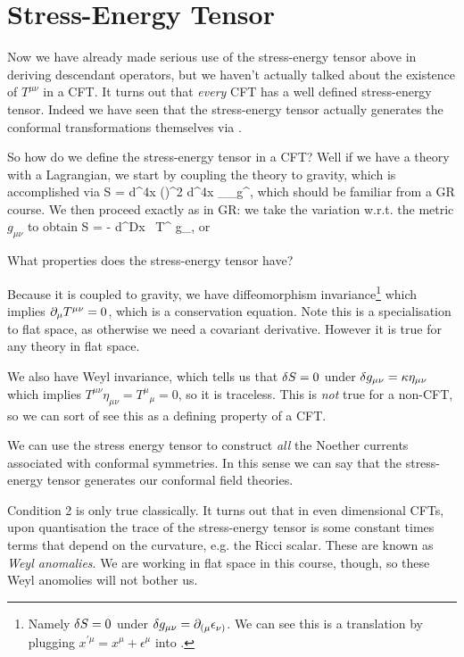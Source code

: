 \section{Stress-Energy Tensor}

Now we have already made serious use of the stress-energy tensor above in deriving descendant operators, but we haven't actually talked about the existence of $T^{\mu\nu}$ in a CFT. It turns out that \textit{every} CFT has a well defined stress-energy tensor. Indeed we have seen that the stress-energy tensor actually generates the conformal transformations themselves via .

So how do we define the stress-energy tensor in a CFT? Well if we have a theory with a Lagrangian, we start by coupling the theory to gravity, which is accomplished via 
\bse 
    S = \int d^4x (\p\phi)^2 \to \int d^4x  \nabla_{\mu}\phi \nabla_{\nu}\phi g^{\mu\nu},
\ese
which should be familiar from a GR course. We then proceed exactly as in GR: we take the variation w.r.t. the metric $g_{\mu\nu}$ to obtain
\bse 
    \del S = - \int d^Dx \,  T^{\mu\nu} \del g_{\mu\nu},  
\ese 
or 

What properties does the stress-energy tensor have? 
\ben 
    \item Because it is coupled to gravity, we have diffeomorphism invariance\footnote{Namely $\delta S = 0$ under $\delta g_{\mu\nu} = \partial_{(\mu}\epsilon_{\nu)}$. We can see this is a translation by plugging $x^{\prime\mu} = x^{\mu} + \epsilon^{\mu}$ into .} which implies $\partial_{\mu}T^{\mu\nu} = 0$, which is a conservation equation. Note this is a specialisation to flat space, as otherwise we need a covariant derivative. However it is true for any theory in flat space.
    \item We also have Weyl invariance, which tells us that $\delta S = 0$ under $\delta g_{\mu\nu} = \kappa \eta_{\mu\nu}$ which implies $T^{\mu\nu}\eta_{\mu\nu} = {T^{\mu}}_{\mu} = 0$, so it is traceless. This is \textit{not} true for a non-CFT, so we can sort of see this as a defining property of a CFT.
    \item We can use the stress energy tensor to construct \textit{all} the Noether currents associated with conformal symmetries. In this sense we can say that the stress-energy tensor generates our conformal field theories.
\een 

\badr
\label{rem:WeylAnom}
    Condition 2 is only true classically. It turns out that in even dimensional CFTs, upon quantisation the trace of the stress-energy tensor is some constant times terms that depend on the curvature, e.g. the Ricci scalar. These are known as \textit{Weyl anomalies}. We are working in flat space in this course, though, so these Weyl anomolies will not bother us. 
\eadr 